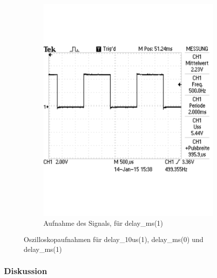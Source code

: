 \documentclass[12pt,a4paper]{article}
\begin{document}
\begin{figure}[H]
\begin{subfigure}[b]{0.28\textwidth}
  \includegraphics[trim = 0mm 50mm 0mm 50mm, clip, width=\textwidth, scale = 0.4]{TEK0013.pdf}
  \caption[Aufnahme des Signals, für delay\_ms(1)]{Aufnahme des Signals, für delay\_ms(1)} 
  \label{fig:g_8}
\end{subfigure}
\caption{Oszilloskopaufnahmen für delay\_10us(1), delay\_ms(0) und delay\_ms(1)}
\label{fig:g_main_2}
\end{figure}


\subsubsection*{Diskussion}
\end{document}
